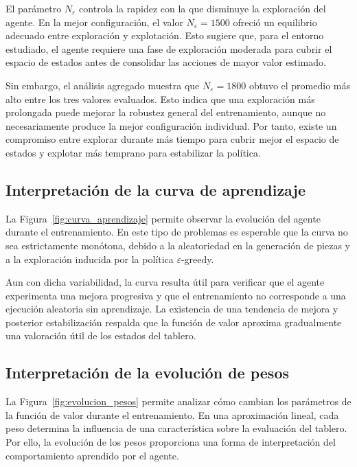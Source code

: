 El parámetro $N_{\varepsilon}$ controla la rapidez con la que disminuye la exploración del agente. En la mejor configuración, el valor $N_{\varepsilon}=1500$ ofreció un equilibrio adecuado entre exploración y explotación. Esto sugiere que, para el entorno estudiado, el agente requiere una fase de exploración moderada para cubrir el espacio de estados antes de consolidar las acciones de mayor valor estimado.

Sin embargo, el análisis agregado muestra que $N_{\varepsilon}=1800$ obtuvo el promedio más alto entre los tres valores evaluados. Esto indica que una exploración más prolongada puede mejorar la robustez general del entrenamiento, aunque no necesariamente produce la mejor configuración individual. Por tanto, existe un compromiso entre explorar durante más tiempo para cubrir mejor el espacio de estados y explotar más temprano para estabilizar la política.

\subsection{Interpretación de la curva de aprendizaje}

La Figura~\ref{fig:curva_aprendizaje} permite observar la evolución del agente durante el entrenamiento. En este tipo de problemas es esperable que la curva no sea estrictamente monótona, debido a la aleatoriedad en la generación de piezas y a la exploración inducida por la política $\varepsilon$-greedy.

Aun con dicha variabilidad, la curva resulta útil para verificar que el agente experimenta una mejora progresiva y que el entrenamiento no corresponde a una ejecución aleatoria sin aprendizaje. La existencia de una tendencia de mejora y posterior estabilización respalda que la función de valor aproxima gradualmente una valoración útil de los estados del tablero.

\subsection{Interpretación de la evolución de pesos}

La Figura~\ref{fig:evolucion_pesos} permite analizar cómo cambian los parámetros de la función de valor durante el entrenamiento. En una aproximación lineal, cada peso determina la influencia de una característica sobre la evaluación del tablero. Por ello, la evolución de los pesos proporciona una forma de interpretación del comportamiento aprendido por el agente.

